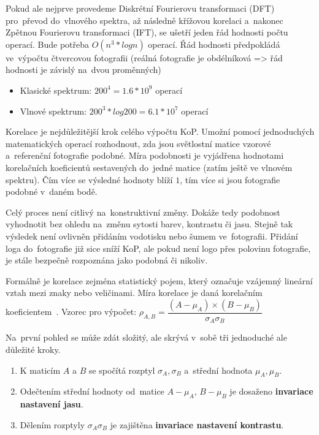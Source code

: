 Pokud ale nejprve provedeme Diskrétní Fourierovu transformaci (DFT) pro~převod do~vlnového spektra, až následně křížovou korelaci a~nakonec Zpětnou Fourierovu transformaci (IFT), se ušetří jeden řád hodnosti počtu operací. Bude potřeba $ O(n^3 * logn) $ operací. Řád hodnosti předpokládá ve~výpočtu čtvercovou fotografii (reálná fotografie je obdélníková => řád hodnosti je závislý na~dvou proměnných)
\begin{itemize}
	\setlength{\parskip}{0pt}
	\setlength{\itemsep}{0pt}
	\item{Klasické spektrum: $ 200^4 = 1.6 * 10^9 $ operací}
	\item{Vlnové spektrum: $ 200^3 * log 200 = 6.1 * 10^7 $ operací}
\end{itemize}

Korelace je nejdůležitější krok celého výpočtu KoP. Umožní pomocí jednoduchých matematických operací rozhodnout, zda jsou světlostní matice vzorové a~referenční fotografie podobné. Míra podobnosti je vyjádřena hodnotami korelačních koeficientů sestavených do~jedné matice (zatím ještě ve vlnovém spektru). Čím více se výsledné hodnoty blíží $ 1 $, tím více si jsou fotografie podobné v~daném bodě.

Celý proces není citlivý na~konstruktivní změny. Dokáže tedy podobnost vyhodnotit bez ohledu na~změnu sytosti barev, kontrastu či jasu. Stejně tak výsledek není ovlivněn přidáním vodotisku nebo šumem ve~fotografii. Přidání loga do~fotografie již sice sníží KoP, ale pokud není logo přes polovinu fotografie, je stále bezpečně rozpoznána jako podobná či nikoliv.

Formálně je korelace zejména statistický pojem, který označuje vzájemný lineární vztah mezi znaky nebo veličinami. Míra korelace je daná korelačním koeficientem~\cite{correlation}. 
Vzorec pro výpočet: $ \rho_{A,B} = \dfrac{(A - \mu_{A}) × (B - \mu_{B})}{\sigma_{A}\sigma_{B}} $

Na~první pohled se může zdát složitý, ale skrývá v~sobě tři jednoduché ale důležité kroky.
\begin{enumerate}
	\setlength{\parskip}{0pt}
	\setlength{\itemsep}{0pt}
	\item{K maticím $ A $ a $ B $ se spočítá rozptyl $ \sigma_{A}, \sigma_{B} $ a~střední hodnota $ \mu_{A}, \mu_{B} $.}
	\item{Odečtením střední hodnoty od~matice $ A - \mu_{A} $, $ B - \mu_{B} $ je dosaženo \textbf{invariace nastavení jasu}.}
	\item{Dělením rozptyly $ \sigma_{A} \sigma_{B} $ je zajištěna \textbf{invariace nastavení kontrastu}.}
\end{enumerate}

